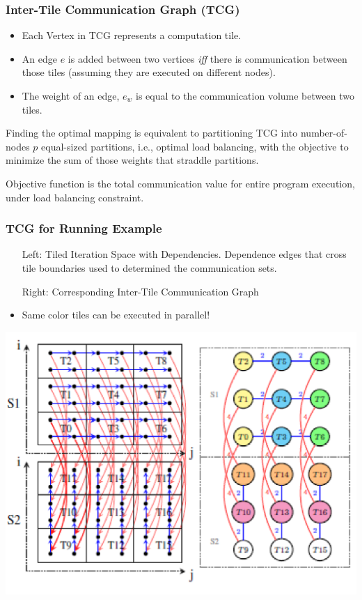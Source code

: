 \documentclass{beamer}
\newcommand{\emp}[1]{\textcolor{DikuRed}{ #1}}
\begin{document}
\begin{frame}[fragile,t]
  \frametitle{Inter-Tile Communication Graph (TCG)}


\begin{itemize}
    \item \emp{Each Vertex} in TCG represents a computation tile. 
    \item \emp{An edge} $e$ is added between two vertices {\em iff}
            there is communication between those tiles (assuming they
                are executed on different nodes).
    \item \emp{The weight} of an edge, $e_w$ is equal to the communication
            volume between two tiles.
\end  {itemize}

\smallskip
Finding the optimal mapping is equivalent to partitioning TCG
into number-of-nodes $p$ equal-sized partitions, i.e., optimal 
load balancing, with the objective to minimize the sum of those
weights that straddle partitions.\medskip

Objective function is the total communication value for entire 
program execution, under load balancing constraint.

\end{frame}


\begin{frame}[fragile,t]
  \frametitle{TCG for Running Example}


\begin{itemize}
    \item[Left:] Tiled Iteration Space with Dependencies. Dependence
                    edges that cross tile boundaries used to
                    determined the communication sets.
    \item[Right:] Corresponding Inter-Tile Communication Graph
    \item Same color tiles can be executed in parallel!
\end  {itemize}


\includegraphics[width=49ex]{ParTeaserFigs/TCGforADI}

\end{frame}
\end{document}
